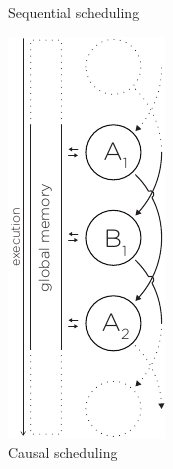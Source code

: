 \begin{figure}
\begin{minipage}[t]{0.23\textwidth}
    \caption{Sequential scheduling}
    \label{fig:sequential-scheduling}
  \end{minipage}
  \hspace{1cm}
  \vrule
  \hspace{1cm}
  \begin{minipage}[t]{0.23\textwidth}
    \centering
    \includegraphics[page=2, height=2\linewidth]{../resources/invariance.pdf}
    \caption{Causal scheduling}
    \label{fig:causal-scheduling}
  \end{minipage}
\end{figure}

